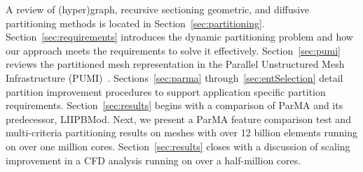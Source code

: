 A review of (hyper)graph, recursive sectioning geometric, and diffusive
partitioning methods is located in Section~\ref{sec:partitioning}.
Section~\ref{sec:requirements} introduces the dynamic partitioning problem and
how our approach meets the requirements to solve it effectively.
Section~\ref{sec:pumi} reviews the partitioned mesh representation in the Parallel
Unstructured Mesh Infrastructure (PUMI)~\cite{ibanez2016pumi,WOLFHPC}.
Sections~\ref{sec:parma} through~\ref{sec:entSelection} detail partition improvement
procedures to support application specific partition requirements.
Section~\ref{sec:results} begins with a comparison of ParMA and its predecessor,
\mbox{LIIPBMod}.
Next, we present a ParMA feature comparison test and multi-criteria partitioning
results on meshes with over 12 billion elements running on over one million cores.
Section~\ref{sec:results} closes with a discussion of scaling improvement
in a CFD analysis running on over a half-million cores.
